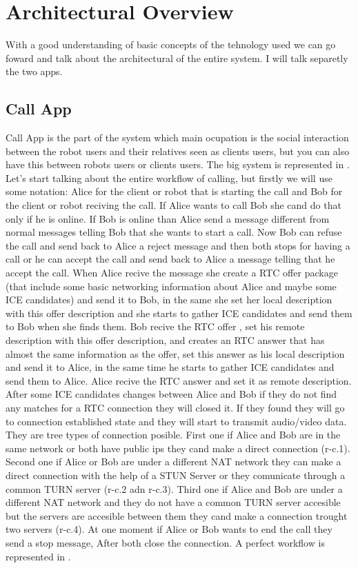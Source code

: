 \chapter{Architectural Overview}
\label{chapter:archi}
With a good understanding of basic concepts of the tehnology used we can go foward and
talk about the architectural of the entire system. I will talk separetly the two apps.


\section{Call App}
\label{sec:callapp}
Call App is the part of the system which main ocupation is the social interaction between
the robot users and their relatives seen as clients users, but you can also have this
between robots users or clients users. The big system is represented in .
Let's start talking about the entire workflow of calling, but firstly
we will use some notation: Alice for the client or robot that is starting the call and Bob for the client or robot reciving the
call. If Alice wants to call Bob she cand do that only if he is online. If Bob is online than Alice send a message
different from normal messages telling Bob that she wants to start a call. Now Bob can refuse the call and send back to
Alice a reject message and then both stops for having a call or he can accept the call and send back to Alice a message
telling that he accept the call. When Alice recive the message she create a RTC offer package (that include some
basic networking information about Alice and maybe some ICE candidates) and send it to Bob, in the same she set 
her local description with this offer description and she starts to gather ICE candidates and send them to 
Bob when she finds them. Bob recive the RTC offer , set his remote description with this offer description, and creates an
RTC answer that has almost the same information as the offer, set this answer as his local description
and send it to Alice, in the same time he starts to gather ICE candidates and send them to Alice.
Alice recive the RTC answer and set it as remote description. After some ICE candidates changes between Alice and
Bob if they do not find any matches for a RTC connection they will closed it. If they found they will go to connection
established state and they will start to transmit audio/video data. They are tree types of connection posible.
First one if Alice and Bob are in the same network or both have public ips they cand make a direct connection (r-c.1).
Second one if Alice or Bob are under a different NAT network they can make a direct connection with the help of a STUN Server
or they comunicate through a common TURN server (r-c.2 adn r-c.3). Third one if Alice and Bob are under a different NAT
network and they do not have a common TURN server accesible but the servers are accesible between them they cand make
a connection trought two servers (r-c.4). At one moment if Alice or Bob wants to end the call they send a stop message, After
both close the connection. A perfect workflow is represented in .

